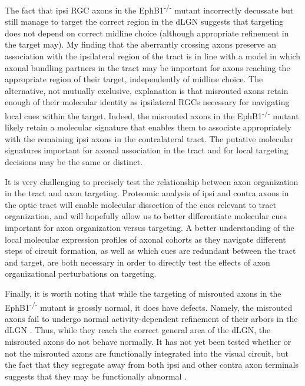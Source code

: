 The fact that ipsi RGC axons in the EphB1\textsuperscript{-/-} mutant incorrectly decussate but still manage to target the correct region in the dLGN suggests that targeting does not depend on correct midline choice (although appropriate refinement in the target may).
My finding that the aberrantly crossing axons preserve an association with the ipsilateral region of the tract is in line with a model in which axonal bundling partners in the tract may be important for axons reaching the appropriate region of their target, independently of midline choice.
The alternative, not mutually exclusive, explanation is that misrouted axons retain enough of their molecular identity as ipsilateral RGCs necessary for navigating local cues within the target.
Indeed, the misrouted axons in the EphB1\textsuperscript{-/-} mutant likely retain a molecular signature that enables them to associate appropriately with the remaining ipsi axons in the contralateral tract.
The putative molecular signatures important for axonal association in the tract and for local targeting decisions may be the same or distinct.

It is very challenging to precisely test the relationship between axon organization in the tract and axon targeting.
Proteomic analysis of ipsi and contra axons in the optic tract will enable molecular dissection of the cues relevant to tract organization, and will hopefully allow us to better differentiate molecular cues important for axon organization versus targeting.
A better understanding of the local molecular expression profiles of axonal cohorts as they navigate different steps of circuit formation, as well as which cues are redundant between the tract and target, are both necessary in order to directly test the effects of axon organizational perturbations on targeting.

Finally, it is worth noting that while the targeting of misrouted axons in the EphB1\textsuperscript{-/-} mutant is grossly normal, it does have defects.
Namely, the misrouted axons fail to undergo normal activity-dependent refinement of their arbors in the dLGN \cite{rebsam2009switching}.
Thus, while they reach the correct general area of the dLGN, the misrouted axons do not behave normally.
It has not yet been tested whether or not the misrouted axons are functionally integrated into the visual circuit, but the fact that they segregate away from both ipsi and other contra axon terminals suggests that they may be functionally abnormal \cite{rebsam2009switching}.

